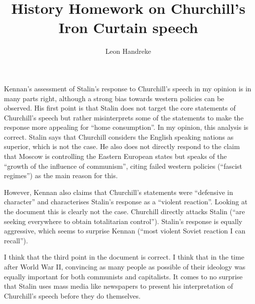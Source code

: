 \documentclass[11pt]{article}
\title{History Homework on Churchill's Iron Curtain speech}
\author{Leon Handreke}
\date{}                                           %
\begin{document}
\doublespacing
\maketitle
{}\selectfont

Kennan's assessment of Stalin's response to Churchill's speech in my opinion is in many parts right, although a strong bias towards western policies can be observed. His first point is that Stalin does not target the core statements of Churchill's speech but rather misinterprets some of the statements to make the response more appealing for ``home consumption''. In my opinion, this analysis is correct. Stalin says that Churchill considers the English speaking nations as superior, which is not the case. He also does not directly respond to the claim that Moscow is controlling the Eastern European states but speaks of the ``growth of the influence of communism'', citing failed western policies (``fascist regimes'') as the main reason for this. 

However, Kennan also claims that Churchill's statements were ``defensive in character'' and characterises Stalin's response as a ``violent reaction''. Looking at the document this is clearly not the case. Churchill directly attacks Stalin (``are seeking everywhere to obtain totalitarian control''). Stalin's response is equally aggressive, which seems to surprise Kennan (``most violent Soviet reaction I can recall'').

I think that the third point in the document is correct. I think that in the time after World War II, convincing as many people as possible of their ideology was equally important for both communists and capitalists. It comes to no surprise that Stalin uses mass media like newspapers to present his interpretation of Churchill's speech before they do themselves.
\end{document}
